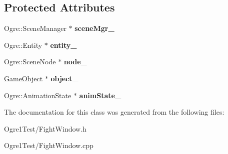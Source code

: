 \subsection*{Protected Attributes}
\begin{DoxyCompactItemize}
\item 
Ogre\+::\+Scene\+Manager $\ast$ {\bfseries scene\+Mgr\+\_\+}\hypertarget{class_fight_window_1_1_game_entity_aed41875f3f2199b42112a159133381d4}{}\label{class_fight_window_1_1_game_entity_aed41875f3f2199b42112a159133381d4}

\item 
Ogre\+::\+Entity $\ast$ {\bfseries entity\+\_\+}\hypertarget{class_fight_window_1_1_game_entity_ab98a631d835a20c81f924b2e107d1ee4}{}\label{class_fight_window_1_1_game_entity_ab98a631d835a20c81f924b2e107d1ee4}

\item 
Ogre\+::\+Scene\+Node $\ast$ {\bfseries node\+\_\+}\hypertarget{class_fight_window_1_1_game_entity_af8c042b8b361180a4103bce98269828f}{}\label{class_fight_window_1_1_game_entity_af8c042b8b361180a4103bce98269828f}

\item 
\hyperlink{class_game_object}{Game\+Object} $\ast$ {\bfseries object\+\_\+}\hypertarget{class_fight_window_1_1_game_entity_a918a457d8e82afea8f9724e671830eaa}{}\label{class_fight_window_1_1_game_entity_a918a457d8e82afea8f9724e671830eaa}

\item 
Ogre\+::\+Animation\+State $\ast$ {\bfseries anim\+State\+\_\+}\hypertarget{class_fight_window_1_1_game_entity_a4e06241ddfb2091bd713d6399e985052}{}\label{class_fight_window_1_1_game_entity_a4e06241ddfb2091bd713d6399e985052}

\end{DoxyCompactItemize}


The documentation for this class was generated from the following files\+:\begin{DoxyCompactItemize}
\item 
Ogre1\+Test/Fight\+Window.\+h\item 
Ogre1\+Test/Fight\+Window.\+cpp\end{DoxyCompactItemize}
